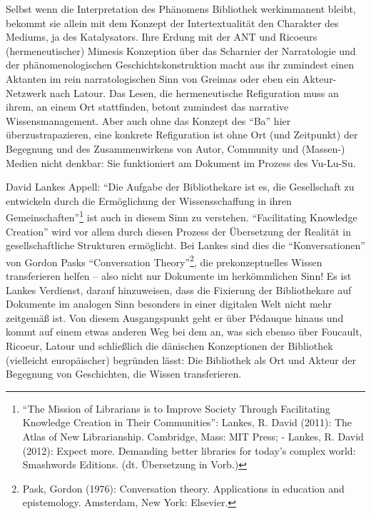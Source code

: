 Selbst wenn die Interpretation des Phänomens Bibliothek werkimmanent
bleibt, bekommt sie allein mit dem Konzept der Intertextualität den
Charakter des Mediums, ja des Katalysators. Ihre Erdung mit der ANT und
Ricoeurs (hermeneutischer) Mimesis Konzeption über das Scharnier der
Narratologie und der phänomenologischen Geschichtskonstruktion macht aus
ihr zumindest einen Aktanten im rein narratologischen Sinn von Greimas
oder eben ein Akteur-Netzwerk nach Latour. Das Lesen, die hermeneutische
Refiguration muss an ihrem, an einem Ort stattfinden, betont zumindest
das narrative Wissensmanagement. Aber auch ohne das Konzept des
\enquote{Ba} hier überzustrapazieren, eine konkrete Refiguration ist
ohne Ort (und Zeitpunkt) der Begegnung und des Zusammenwirkens von
Autor, Community und (Massen-) Medien nicht denkbar: Sie funktioniert am
Dokument im Prozess des Vu-Lu-Su.

David Lankes Appell: \enquote{Die Aufgabe der Bibliothekare ist es, die
Gesellschaft zu entwickeln durch die Ermöglichung der Wissensschaffung
in ihren Gemeinschaften}\footnote{\enquote{The Mission of Librarians is
  to Improve Society Through Facilitating Knowledge Creation in Their
  Communities}: Lankes, R. David (2011): The Atlas of New Librarianship.
  Cambridge, Mass: MIT Press; - Lankes, R. David (2012): Expect more.
  Demanding better libraries for today's complex world: Smashwords
  Editions. (dt. Übersetzung in Vorb.)} ist auch in diesem Sinn zu
verstehen. \enquote{Facilitating Knowledge Creation} wird vor allem
durch diesen Prozess der Übersetzung der Realität in gesellschaftliche
Strukturen ermöglicht. Bei Lankes sind dies die \enquote{Konversationen}
von Gordon Pasks \enquote{Conversation Theory}\footnote{Pask, Gordon
  (1976): Conversation theory. Applications in education and
  epistemology. Amsterdam, New York: Elsevier.}, die prekonzeptuelles
Wissen transferieren helfen -- also nicht nur Dokumente im herkömmlichen
Sinn! Es ist Lankes Verdienst, darauf hinzuweisen, dass die Fixierung
der Bibliothekare auf Dokumente im analogen Sinn besonders in einer
digitalen Welt nicht mehr zeitgemäß ist. Von diesem Ausgangspunkt geht
er über Pédauque hinaus und kommt auf einem etwas anderen Weg bei dem
an, was sich ebenso über Foucault, Ricoeur, Latour und schließlich die
dänischen Konzeptionen der Bibliothek (vielleicht europäischer)
begründen lässt: Die Bibliothek als Ort und Akteur der Begegnung von
Geschichten, die Wissen transferieren. 
